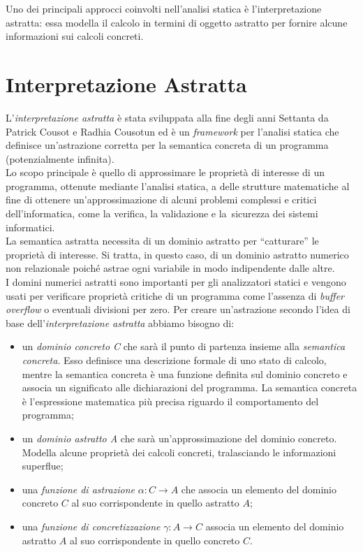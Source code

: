 \documentclass[a4paper, 10pt]{report}
\begin{document}
\noindent
Uno dei principali approcci coinvolti nell'analisi statica è l'interpretazione astratta: essa modella il calcolo in termini di oggetto astratto per fornire alcune informazioni sui calcoli concreti.\\

\section*{Interpretazione Astratta}
L’\textit{interpretazione astratta} è  stata sviluppata alla fine degli anni Settanta da Patrick Cousot e Radhia Cousotun ed è un \textit{framework} per l’analisi statica che definisce un’astrazione corretta per la semantica concreta di un programma (potenzialmente infinita).
\\
Lo scopo principale è quello di approssimare le proprietà di interesse di un programma, ottenute mediante l'analisi statica, a delle strutture matematiche al fine di ottenere un'approssimazione di alcuni problemi complessi e critici dell'informatica, come la verifica, la validazione e la~sicurezza dei sistemi informatici.
\\
La semantica astratta necessita di un dominio astratto per “catturare” le proprietà di interesse. Si tratta, in questo caso, di un dominio astratto numerico non relazionale poiché astrae ogni variabile in modo indipendente dalle altre.
\\
I domini numerici astratti sono importanti per gli analizzatori statici e vengono usati per verificare proprietà critiche di un programma come l'assenza di \textit{buffer overflow} o eventuali divisioni per zero.
\newpage
\noindent
Per creare un'astrazione secondo l'idea di base dell'\textit{interpretazione astratta} abbiamo bisogno di:
\begin{itemize}
	\item un \textit{dominio concreto C} che sarà il punto di partenza insieme alla \textit{semantica concreta}. Esso definisce una descrizione formale di uno stato di calcolo, mentre la semantica concreta è una funzione definita sul dominio concreto e associa un significato alle dichiarazioni del programma. La semantica concreta è l'espressione matematica più precisa riguardo il comportamento del programma;
	\item un \textit{dominio astratto A} che sarà un'approssimazione del dominio concreto. Modella alcune proprietà dei calcoli concreti, tralasciando le informazioni superflue;
	\item una \textit{funzione di astrazione} $\alpha: C \rightarrow A$ che associa un elemento del dominio concreto $C$ al suo corrispondente in quello astratto $A$;
	\item una \textit{funzione di concretizzazione} $\gamma: A \rightarrow C$ associa un elemento del dominio astratto $A$ al suo corrispondente in quello concreto $C$.\\
\end{itemize}
\end{document}
